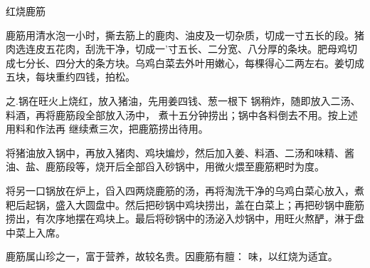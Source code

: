 \begin{recipe}{红烧鹿筋}

\ingredients


\cooking

\step 鹿筋用清水泡一小时，撕去筋上的鹿肉、油皮及一切杂质，切成一寸五长的段。猪肉选连皮五花肉，刮洗干净，切成一'寸五长、二分宽、八分厚的条块。肥母鸡切成七分长、四分大的条方块。乌鸡白菜去外叶用嫩心，每棵得心二两左右。姜切成五块，每块重约四钱，拍松。

之.锅在旺火上烧红，放入猪油，先用姜四钱、葱一根下 锅稍炸，随即放入二汤、料酒，再将鹿筋段全部放入汤中， 煮十五分钟捞出；锅中各料倒去不用。按上述用料和作法再 继续煮三次，把鹿筋捞出待用。

\step 将猪油放入锅中，再放入猪肉、鸡块煸炒，然后加入姜、料酒、二汤和味精、酱油、盐、鹿筋段等，烧开后全部舀入砂锅中，用微火煨至鹿筋粑时为度。

\step 将另一口锅放在炉上，舀入四两烧鹿筋的汤，再将淘洗干净的乌鸡白菜心放入，煮粑后起锅，盛入大圆盘中。然后把砂锅中鸡块捞出，盖在白菜上；再把砂锅中鹿筋捞出，有次序地摆在鸡块上。最后将砂锅中的汤泌入炒锅中，用旺火熬酽，淋于盘中菜上入席。

\notes

鹿筋属山珍之一，富于营养，故较名贵。因鹿筋有膻： 味，以红烧为适宜。

\end{recipe}

